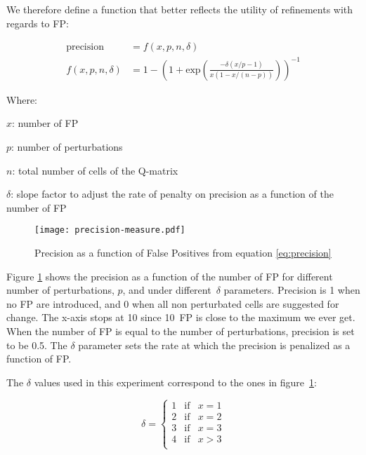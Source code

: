 \documentclass{edm_template}
\begin{document}
We therefore define a function that better reflects the utility of refinements with regards to FP:

\begin{align}
\mathrm{precision} & =  f(x, p, n, \delta) \label{eq:precision} \\
f(x, p, n, \delta) & =  1- \left( 1 +  \mathrm{exp}\left( \frac{-\delta (x/p - 1)}{x(1-x/(n-p))} \right) \right)^{-1} \nonumber
\end{align}

Where:
\begin{compactitem}
\item[$x$:] number of FP
\item[$p$:] number of perturbations
\item[$n$:] total number of cells of the Q-matrix
\item[$\delta$:] slope factor to adjust the rate of penalty on precision as a function of the number of FP
\end{compactitem}

\begin{figure}
  \centerline{\texttt{[image: precision-measure.pdf]}}
  \caption{Precision as a function of False Positives from equation \ref{eq:precision}}
  \label{fig:precision}
\end{figure}

Figure \ref{fig:precision} shows the precision as a function of the number of FP for different number of perturbations, $p$, and under different~$\delta$ parameters.  Precision is 1 when no FP are introduced, and 0 when all non perturbated cells are suggested for change.  The x-axis stops at 10 since 10~FP is close to the maximum we ever get.  When the number of FP is equal to the number of perturbations, precision is set to be 0.5. The $\delta$ parameter sets the rate at which the precision is penalized as a function of FP.

The $\delta$ values used in this experiment correspond to the ones in figure~\ref{fig:precision}:

\begin{equation*}
\delta = \left\lbrace 
\begin{array}{lll}
  1 & \mathrm{if} & x = 1\\
  2 & \mathrm{if} & x = 2\\
  3 & \mathrm{if} & x = 3\\
  4 & \mathrm{if} & x > 3\\
\end{array}
\right.
\end{equation*}
\end{document}
